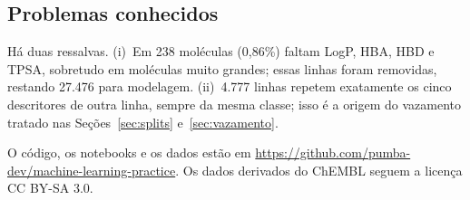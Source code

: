 \subsection{Problemas conhecidos}

Há duas ressalvas. (i)~Em 238 moléculas (0,86\%) faltam LogP, HBA, HBD e TPSA, sobretudo em moléculas muito grandes; essas linhas foram removidas, restando 27.476 para modelagem. (ii)~4.777 linhas repetem exatamente os cinco descritores de outra linha, sempre da mesma classe; isso é a origem do vazamento tratado nas Seções~\ref{sec:splits} e~\ref{sec:vazamento}.

O código, os notebooks e os dados estão em \url{https://github.com/pumba-dev/machine-learning-practice}. Os dados derivados do ChEMBL seguem a licença CC BY-SA 3.0.
